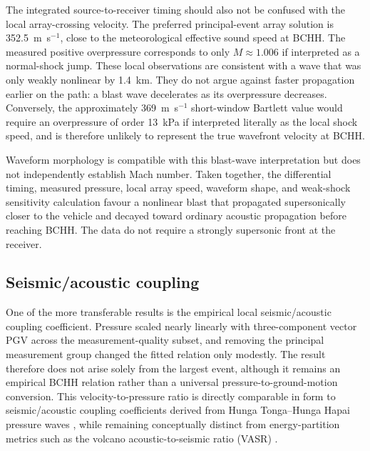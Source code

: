 \documentclass[]{seismica}
\begin{document}
The integrated source-to-receiver timing should also not be confused with the
local array-crossing velocity. The preferred principal-event array solution is
352.5~m~s$^{-1}$, close to the meteorological effective sound speed at BCHH.
The measured positive overpressure corresponds to only $M\approx1.006$ if
interpreted as a normal-shock jump. These local observations are consistent
with a wave that was only weakly nonlinear by 1.4~km. They do not argue against
faster propagation earlier on the path: a blast wave decelerates as its
overpressure decreases. Conversely, the approximately 369~m~s$^{-1}$
short-window Bartlett value would require an overpressure of order 13~kPa if
interpreted literally as the local shock speed, and is therefore unlikely to
represent the true wavefront velocity at BCHH.

Waveform morphology is compatible with this blast-wave interpretation but
does not independently establish Mach number. Taken together, the differential
timing, measured pressure, local array speed, waveform shape, and weak-shock
sensitivity calculation favour a nonlinear blast that propagated supersonically
closer to the vehicle and decayed toward ordinary acoustic propagation before
reaching BCHH. The data do not require a strongly supersonic front at the
receiver.

\subsection{Seismic/acoustic coupling}

One of the more transferable results is the empirical local
seismic/acoustic coupling coefficient. Pressure scaled nearly linearly with
three-component vector PGV across the measurement-quality subset, and removing
the principal measurement group changed the fitted relation only modestly. The
result therefore does not arise solely from the largest event, although it
remains an empirical BCHH relation rather than a universal
pressure-to-ground-motion conversion. This velocity-to-pressure ratio is
directly comparable in form to seismic/acoustic coupling coefficients derived
from Hunga Tonga--Hunga Ha\textquotesingle pai pressure waves
\citep{anthony_hunga_coupling_2023,macpherson_hunga_coupling_2025},
while remaining conceptually distinct from energy-partition metrics such as
the volcano acoustic-to-seismic ratio (VASR) \citep{johnson_aster_2005}.
\end{document}
